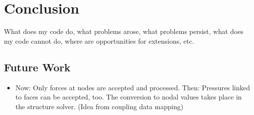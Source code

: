 \section{Conclusion}
What does my code do, what problems arose, what problems persist, what does my code cannot do, where are opportunities for extensions, etc.
 \subsection{Future Work}
  \begin{itemize}
  	\item Now: Only forces at nodes are accepted and processed. Then: Pressures linked to faces can be accepted, too. The conversion to nodal values takes place in the structure solver. (Idea from coupling data mapping)
  \end{itemize}
\newpage